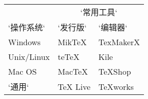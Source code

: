 \begin{table}[htbp]
\centering
\begin{tabular}{lll}
    \toprule
    & \multicolumn{2}{c}{`常用工具`} \\
    \cmidrule{2-3}
    `操作系统` & `发行版` & `编辑器` \\
    \midrule
    Windows     & MikTeX    & TexMakerX \\
    Unix/Linux  & teTeX     & Kile \\
    Mac OS      & MacTeX    & TeXShop \\
    `通用`        & TeX Live  & TeXworks \\
    \bottomrule
\end{tabular}
\end{table}

